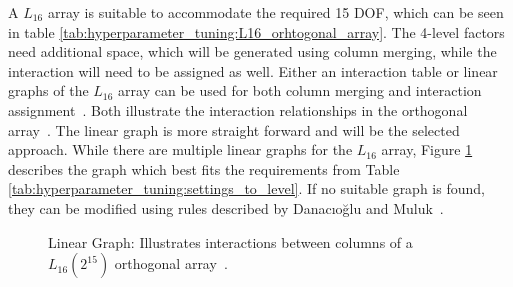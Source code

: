 A $L_{16}$ array is suitable to accommodate the required 15 DOF, which can be seen in table \ref{tab:hyperparameter_tuning:L16_orhtogonal_array}.
The 4-level factors need additional space, which will be generated using column merging, while the interaction will need to be assigned as well.
Either an interaction table or linear graphs of the $L_{16}$ array can be used for both column merging and interaction assignment~\cite{danacioglu_taguchi_2005}. Both illustrate the interaction relationships in the orthogonal array~\cite{yang_design_2009}.
The linear graph is more straight forward and will be the selected approach. While there are multiple linear graphs for the $L_{16}$ array, Figure \ref{fig:hyperparameter_tuning:linear_graph} describes the graph which best fits the requirements from Table \ref{tab:hyperparameter_tuning:settings_to_level}. If no suitable graph is found, they can be modified using rules described by Danacıoğlu and Muluk~\cite{danacioglu_taguchi_2005}.

\begin{figure}[H]
	\centering
	\caption{Linear Graph: Illustrates interactions between columns of a $L_{16}(2^{15})$ orthogonal array~\cite{yang_design_2009}.}
	\label{fig:hyperparameter_tuning:linear_graph}
\end{figure}

